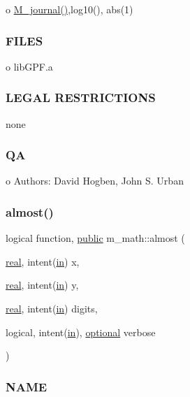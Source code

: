 o \hyperlink{M__journal_83_8txt_aba3a4e3e5bac44e7e807c3472bb2af91}{M\+\_\+journal()},log10(), abs(1)

\subsubsection*{F\+I\+L\+ES}

o lib\+G\+P\+F.\+a \subsubsection*{L\+E\+G\+AL R\+E\+S\+T\+R\+I\+C\+T\+I\+O\+NS}

none \subsubsection*{QA}

o Authors\+: David Hogben, John S. Urban \mbox{\label{namespacem__math_a5c6526b86e62cffde2dc20e53fd3be22}} 
\subsubsection{\texorpdfstring{almost()}{almost()}}
{\footnotesize\ttfamily logical function, \hyperlink{M__stopwatch_83_8txt_a2f74811300c361e53b430611a7d1769f}{public} m\+\_\+math\+::almost (\begin{DoxyParamCaption}\item[{\hyperlink{read__watch_83_8txt_abdb62bde002f38ef75f810d3a905a823}{real}, intent(\hyperlink{M__journal_83_8txt_afce72651d1eed785a2132bee863b2f38}{in})}]{x,  }\item[{\hyperlink{read__watch_83_8txt_abdb62bde002f38ef75f810d3a905a823}{real}, intent(\hyperlink{M__journal_83_8txt_afce72651d1eed785a2132bee863b2f38}{in})}]{y,  }\item[{\hyperlink{read__watch_83_8txt_abdb62bde002f38ef75f810d3a905a823}{real}, intent(\hyperlink{M__journal_83_8txt_afce72651d1eed785a2132bee863b2f38}{in})}]{digits,  }\item[{logical, intent(\hyperlink{M__journal_83_8txt_afce72651d1eed785a2132bee863b2f38}{in}), \hyperlink{option__stopwatch_83_8txt_aa4ece75e7acf58a4843f70fe18c3ade5}{optional}}]{verbose }\end{DoxyParamCaption})}



\subsubsection*{N\+A\+ME}

